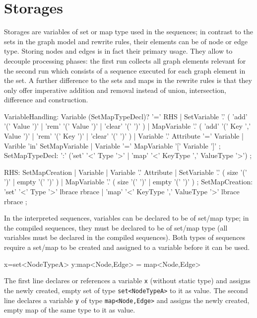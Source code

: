 \section{Storages}

Storages are variables of set or map type used in the sequences;
in contrast to the sets in the graph model and rewrite rules, their elements can be of node or edge type. 
Storing nodes and edges is in fact their primary usage. 
They allow to decouple processing phases: the first run collects all graph elements relevant for the second run which consists of a sequence executed for each graph element in the set.
A further difference to the sets and maps in the rewrite rules is that they only offer imperative addition and removal instead of union, intersection, difference and construction.
 
\begin{rail}
  VariableHandling: 
    Variable (SetMapTypeDecl)? '=' RHS |
    SetVariable '.' ( 'add' '(' Value ')' | 'rem' '(' Value ')' | 'clear' '(' ')' ) |
    MapVariable '.' ( 'add' '(' Key ',' Value ')' | 'rem' '(' Key ')' | 'clear' '(' ')' ) |
	Variable '.' Attribute '=' Variable |
	Varible 'in' SetMapVariable |
	Variable '=' MapVariable '[' Variable ']'
    ;
  SetMapTypeDecl: 
    ':' ('set' '<' Type '>' | 'map' '<' KeyType ',' ValueType '>')
    ;
\end{rail}\makeatother

\begin{rail}
  RHS:
    SetMapCreation |
	Variable |
	Variable '.' Attribute |
    SetVariable '.' ( size '(' ')' | empty '(' ')' ) |
    MapVariable '.' ( size '(' ')' | empty '(' ')' )
    ;
  SetMapCreation:
	'set' '<' Type '>' lbrace rbrace |
    'map' '<' KeyType ',' ValueType '>' lbrace rbrace
	;
\end{rail}\makeatother

In the interpreted sequences, variables can be declared to be of set/map type;
in the compiled sequences, they must be declared to be of set/map type (all variables must be declared in the compiled sequences).
Both types of sequences require a set/map to be created and assigned to a variable before it can be used.

\begin{example}
\begin{grgen}
x=set<NodeTypeA>{}
y:map<Node,Edge> = map<Node,Edge>{}
\end{grgen}
The first line declares or references a variable \texttt{x} (without static type) and assigns the newly created, empty set of type \texttt{set<NodeTypeA>} to it as value.
The second line declares a variable \texttt{y} of type \texttt{map<Node,Edge>} and assigns the newly created, empty map of the same type to it as value.
\end{example}

